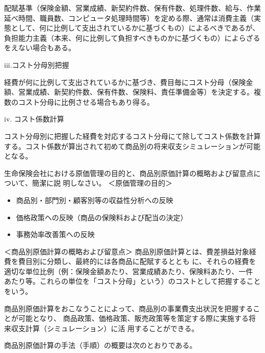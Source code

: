 \documentclass[report,gutter=10mm,fore-edge=10mm,uplatex,dvipdfmx]{jlreq}
\begin{document}
配賦基準（保険金額、営業成績、新契約件数、保有件数、処理件数、給与、作業延べ時間、職員数、コンピュータ処理時間等）を定める際、通常は消費主義（実態として、何に比例して支出されているかに基づくもの）によるべきであるが、負担能力主義（本来、何に比例して負担すべきものかに基づくもの）によらざるをえない場合もある。

iii.コスト分母別把握

経費が何に比例して支出されているかに基づき、費目毎にコスト分母（保険金額、営業成績、新契約件数、保有件数、保険料、責任準備金等）を決定する。複数のコスト分母に比例させる場合もあり得る。

iv. コスト係数計算

コスト分母別に把握した経費を対応するコスト分母にて除してコスト係数を計算する。コスト係数が算出されて初めて商品別の将来収支シミュレーションが可能となる。



\vspace{1zh}
生命保険会社における原価管理の目的と、商品別原価計算の概略および留意点について、簡潔に説
明しなさい。
\answer{}
＜原価管理の目的＞
\begin{itemize}
\item[] 商品別・部門別・顧客別等の収益性分析への反映
\item[] 価格政策への反映（商品の保険料および配当の決定）
\item[] 事務効率改善策への反映
\end{itemize}

＜商品別原価計算の概略および留意点＞
商品別原価計算とは、費差損益対象経費を費目別に分類し、最終的には各商品に配賦するととも
に、それらの経費を適切な単位比例（例：保険金額あたり、営業成績あたり、保険料あたり、一件
あたり等。これらの単位を「コスト分母」という）のコストとして把握することをいう。

商品別原価計算をおこなうことによって、商品別の事業費支出状況を把握することが可能となり、
商品政策、価格政策、販売政策等を策定する際に実施する将来収支計算（シミュレーション）に活
用することができる。

商品別原価計算の手法（手順）の概要は次のとおりである。
\end{document}
